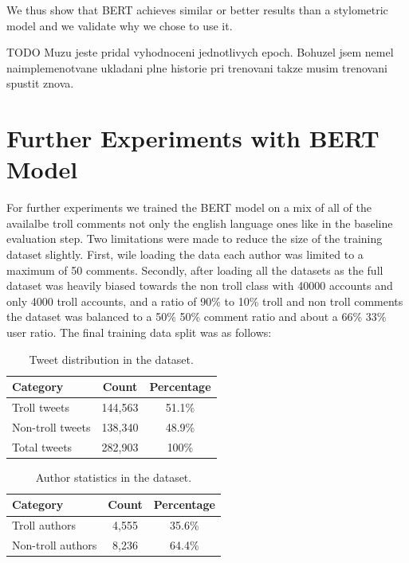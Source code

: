 \documentclass[twoside]{ctuthesis}
\theoremstyle{plain}
\theoremstyle{definition}
\theoremstyle{note}
\begin{document}
We thus show that BERT achieves similar or better results than a stylometric model and we validate why we chose to use it.

TODO Muzu jeste pridal vyhodnoceni jednotlivych epoch. Bohuzel jsem nemel naimplemenotvane ukladani plne historie pri trenovani takze musim trenovani spustit znova.

\section{Further Experiments with BERT Model}

For further experiments we trained the BERT model on a mix of all of the availalbe troll comments not only the english language ones like in the baseline evaluation step. Two limitations were made to reduce the size of the training dataset slightly. First, wile loading the data each author was limited to a maximum of 50 comments. Secondly, after loading all the datasets  as the full dataset was heavily biased towards the non troll class with 40000 accounts and only 4000 troll accounts, and a ratio of 90\% to 10\% troll and non troll comments the dataset was balanced to a 50\% 50\% comment ratio and about a 66\% 33\% user ratio. The final training data split was as follows:

\begin{table}[ht]
    \centering
    \caption{Tweet distribution in the dataset.}
    \label{tab:tweet_distribution}
    \begin{tabular}{lcc}
        \toprule
        \textbf{Category} & \textbf{Count} & \textbf{Percentage} \\
        \midrule
        Troll tweets     & 144,563 & 51.1\% \\
        Non-troll tweets & 138,340 & 48.9\% \\
        \midrule
        Total tweets     & 282,903 & 100\% \\
        \bottomrule
    \end{tabular}
\end{table}

\begin{table}[ht]
    \centering
    \caption{Author statistics in the dataset.}
    \label{tab:author_statistics}
    \begin{tabular}{lcc}
        \toprule
        \textbf{Category} & \textbf{Count} & \textbf{Percentage} \\
        \midrule
        Troll authors     & 4,555 & 35.6\% \\
        Non-troll authors & 8,236 & 64.4\% \\
        \bottomrule
    \end{tabular}
\end{table}
\end{document}
